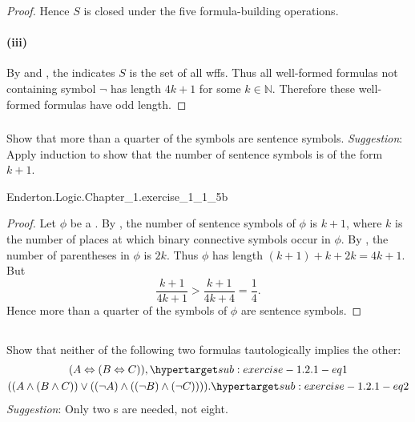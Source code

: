 \documentclass{report}
\begin{document}
\begin{proof}
      Hence $S$ is closed under the five formula-building operations.

    \paragraph{(iii)}%

      By  and ,
        the  indicates $S$ is the set of all
        wffs.
      Thus all well-formed formulas not containing symbol $\neg$ has length
        $4k + 1$ for some $k \in \mathbb{N}$.
      Therefore these well-formed formulas have odd length.

  \end{proof}

\subsubsection{}%

  Show that more than a quarter of the symbols are sentence symbols.
  \textit{Suggestion}: Apply induction to show that the number of sentence
    symbols is of the form $k + 1$.

    {Enderton.Logic.Chapter\_1.exercise\_1\_1\_5b}

  \begin{proof}

    Let $\phi$ be a .
    By , the number of sentence symbols of $\phi$ is
      $k + 1$, where $k$ is the number of places at which binary connective
      symbols occur in $\phi$.
    By , the number of parentheses in $\phi$ is
      $2k$.
    Thus $\phi$ has length $(k + 1) + k + 2k = 4k + 1$.
    But $$\frac{k + 1}{4k + 1} > \frac{k + 1}{4k + 4} = \frac{1}{4}.$$
    Hence more than a quarter of the symbols of $\phi$ are sentence symbols.

  \end{proof}

\subsection{}%

  Show that neither of the following two formulas tautologically implies the
    other:
    \begin{gather}
      (A \Leftrightarrow (B \Leftrightarrow C)),
        \hyperlabel{sub:exercise-1.2.1-eq1} \\
      ((A \land (B \land C)) \lor ((\neg A) \land ((\neg B) \land (\neg C)))).
        \hyperlabel{sub:exercise-1.2.1-eq2}
    \end{gather}
  \textit{Suggestion}: Only two s are needed, not
    eight.
\end{document}
